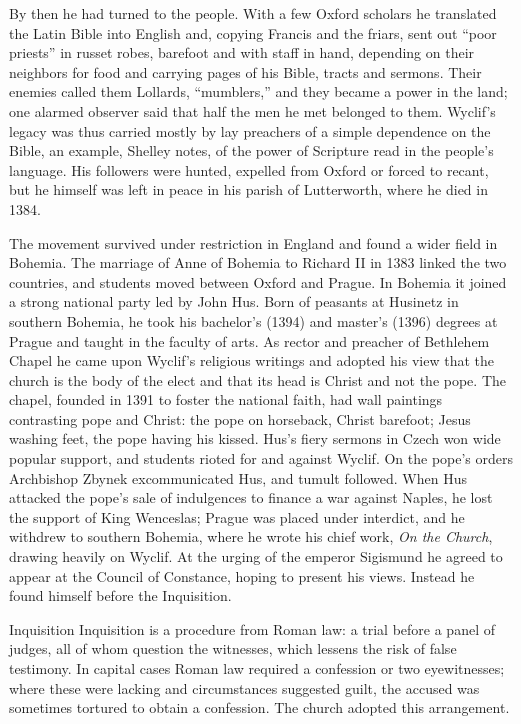 By then he had turned to the people. With a few Oxford scholars he translated the Latin Bible into
English and, copying Francis and the friars, sent out ``poor priests'' in russet robes, barefoot and
with staff in hand, depending on their neighbors for food and carrying pages of his Bible, tracts and
sermons. Their enemies called them Lollards, ``mumblers,'' and they became a power in the land; one
alarmed observer said that half the men he met belonged to them. Wyclif's legacy was thus carried mostly
by lay preachers of a simple dependence on the Bible, an example, Shelley notes, of the power of
Scripture read in the people's language. His followers were hunted, expelled from Oxford or forced to
recant, but he himself was left in peace in his parish of Lutterworth, where he died in 1384.

The movement survived under restriction in England and found a wider field in Bohemia. The marriage
of Anne of Bohemia to Richard II in 1383 linked the two countries, and students moved between Oxford
and Prague. In Bohemia it joined a strong national party led by John Hus. Born of peasants at
Husinetz in southern Bohemia, he took his bachelor's (1394) and master's (1396) degrees at Prague and
taught in the faculty of arts. As rector and preacher of Bethlehem Chapel he came upon Wyclif's
religious writings and adopted his view that the church is the body of the elect and that its head is Christ and not the pope. The chapel, founded in 1391 to foster the national faith, had wall paintings contrasting
pope and Christ: the pope on horseback, Christ barefoot; Jesus washing feet, the pope having his
kissed. Hus's fiery sermons in Czech won wide popular support, and students rioted for and against
Wyclif. On the pope's orders Archbishop Zbynek excommunicated Hus, and tumult followed. When Hus
attacked the pope's sale of indulgences to finance a war against Naples, he lost the support of King
Wenceslas; Prague was placed under interdict, and he withdrew to southern Bohemia, where he wrote
his chief work, \emph{On the Church}, drawing heavily on Wyclif. At the urging of the emperor
Sigismund he agreed to appear at the Council of Constance, hoping to present his views. Instead he
found himself before the Inquisition.

\begin{sidebox}{Inquisition}
Inquisition is a procedure from Roman law: a trial before a panel of judges, all of whom question
the witnesses, which lessens the risk of false testimony. In capital cases Roman law required a
confession or two eyewitnesses; where these were lacking and circumstances suggested guilt, the
accused was sometimes tortured to obtain a confession. The church adopted this arrangement.
\end{sidebox}

